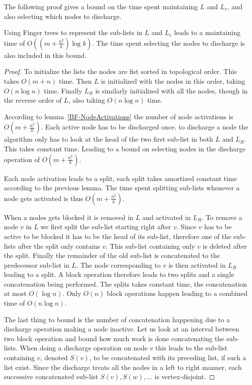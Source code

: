 The following proof gives a bound on the time spent maintaining $L$ and $L_r$, and also selecting which nodes to discharge.
\begin{lemma}
	Using Finger trees to represent the sub-lists in $L$ and $L_r$ leads to a maintaining time of $O((m+\frac{n^2}{k})\log{k})$. 
	The time spent selecting the nodes to discharge is also included in this bound.
\end{lemma}
\begin{proof}
	
	To initialize the lists the nodes are fist sorted in topological order. This takes $O(m+n)$ time. Then $L$ is initialized
	with the nodes in this order, taking $O(n\log{n})$ time. Finally $L_R$ is similarly initialized with all the nodes,
	though in the reverse order of $L$, also taking $O(n\log{n})$ time.
	
	According to lemma~\ref{BF-NodeActivations} the number of node activations is $O(m+\frac{n^2}{k})$. Each active node
	has to be discharged once. to discharge a node the algorithm only has to look at the head of the two first sub-list
	in both $L$ and $L_R$. This takes constant time. Leading to a bound on selecting nodes in the discharge operation of
	$O(m+\frac{n^2}{k})$.
	
	Each node activation leads to a split, each split takes amortized constant time according to the previous lemma.
	The time spent splitting sub-lists whenever a node gets activated is thus $O(m+\frac{n^2}{k})$. 
	
	When a nodes gets blocked it is removed in $L$ and activated in $L_R$. To remove a node $v$ in $L$ we first split
	the sub-list starting right after $v$. Since $v$ has to be active to be blocked it has to be the head of its sub-list,
	therefore one of the sub-lists after the split only contains $v$. This sub-list containing only $v$ is deleted after the split. 
	Finally the remainder of the old sub-list is concatenated to the predecessor sub-list in $L$. The node corresponding to $v$ is then 
	activated in $L_R$ leading to a split. A block operation therefore leads to two splits and a single concatenation being performed.
	The splits takes constant time, the concatenation at most $O(\log{n})$. Only $O(n)$ block operations happen leading to a combined time
	of $O(n\log{n})$.
	
	The last thing to bound is the number of concatenation happening due to a discharge operation making a node inactive. 
	Let us look at an interval between two block operation and bound how much work is done concatenating the sub-lists.
	When doing a discharge operation on node $v$ this leads to the sub-list containing $v$, denoted $S(v)$, to be
	concatenated with its preceding list, if such a list exist. Since the discharge treats all the nodes in a left to right manner, 
	each successive concatenated sub-list $S(v),S(w),\dots$ is vertex-disjoint. 
	

\end{proof}
